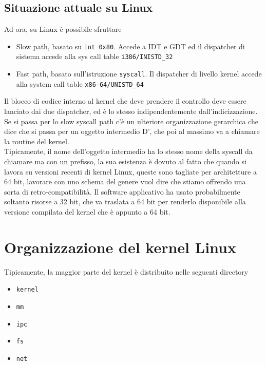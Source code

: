 \documentclass[12pt, oneside]{extbook}
\begin{document}
\subsection{Situazione attuale su Linux}
Ad ora, su Linux è possibile sfruttare
\begin{itemize}
\item Slow path, basato su \texttt{int 0x80}. Accede a IDT e GDT ed il dispatcher di sistema accede alla sys call table \texttt{i386/INISTD\_32}
\item Fast path, basato sull'istruzione \texttt{syscall}. Il dispatcher di livello kernel accede alla system call table \texttt{x86-64/UNISTD\_64}
\end{itemize}
Il blocco di codice interno al kernel che deve prendere il controllo deve essere lanciato dai due dispatcher, ed è lo stesso indipendentemente dall'indicizzazione. Se si passa per lo slow syscall path c'è un ulteriore organizzazione gerarchica che dice che si passa per un oggetto intermedio D', che poi al massimo va a chiamare la routine del kernel.\\ Tipicamente, il nome dell'oggetto intermedio ha lo stesso nome della syscall da chiamare ma con un prefisso, la sua esistenza è dovuto al fatto che quando si lavora su versioni recenti di kernel Linux, queste sono tagliate per architetture a 64 bit, lavorare con uno schema del genere vuol dire che stiamo offrendo una sorta di retro-compatibilità. Il software applicativo ha usato probabilmente soltanto risorse a 32 bit, che va traslata a 64 bit per renderlo disponibile alla versione compilata del kernel che è appunto a 64 bit.
\section{Organizzazione del kernel Linux}
Tipicamente, la maggior parte del kernel è distribuito nelle seguenti directory
\begin{itemize}
\item \texttt{kernel}
\item \texttt{mm}
\item \texttt{ipc}
\item \texttt{fs}
\item \texttt{net}
\end{itemize}
\end{document}
